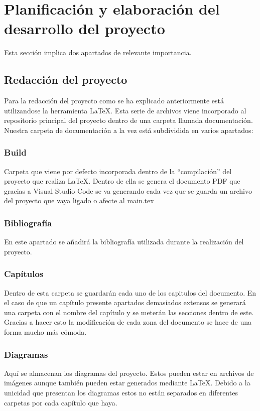 \section{Planificación y elaboración del desarrollo del proyecto}

Esta sección implica dos apartados de relevante importancia.

\subsection{Redacción del proyecto}

Para la redacción del proyecto como se ha explicado anteriormente está utilizandose la herramienta LaTeX. Esta serie de archivos viene incorporado al repositorio principal del proyecto dentro de una carpeta llamada documentación.
\\Nuestra carpeta de documentación a la vez está subdividida en varios apartados:

\subsubsection{Build}
Carpeta que viene por defecto incorporada dentro de la ``compilación'' del proyecto que realiza LaTeX. Dentro de ella se genera el documento PDF que gracias a Visual Studio Code se va generando cada vez que se guarda un archivo del proyecto que vaya ligado o afecte al main.tex

\subsubsection{Bibliografía}
En este apartado se añadirá la bibliografía utilizada durante la realización del proyecto.

\subsubsection{Capítulos}
Dentro de esta carpeta se guardarán cada uno de los capitulos del documento. En el caso de que un capítulo presente apartados demasiados extensos se generará una carpeta con el nombre del capítulo y se meterán las secciones dentro de este. Gracias a hacer esto la modificación de cada zona del documento se hace de una forma mucho más cómoda.

\subsubsection{Diagramas}
Aquí se almacenan los diagramas del proyecto. Estos pueden estar en archivos de imágenes aunque también pueden estar generados mediante LaTeX. Debido a la unicidad que presentan los diagramas estos no están separados en diferentes carpetas por cada capítulo que haya.

